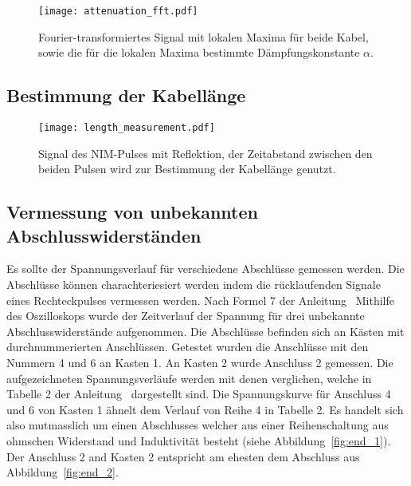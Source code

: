 \begin{figure}
  \centering
  \texttt{[image: attenuation\_fft.pdf]}
  \caption{%
    Fourier-transformiertes Signal mit lokalen Maxima für beide Kabel, sowie die für die lokalen Maxima bestimmte Dämpfungskonstante $α$.
  }\label{fig:attenuation_fft}
\end{figure}

\subsection{Bestimmung der Kabellänge}

\begin{figure}
  \centering
  \texttt{[image: length\_measurement.pdf]}
  \caption{%
    Signal des NIM-Pulses mit Reflektion, der Zeitabstand zwischen den beiden Pulsen wird zur Bestimmung der Kabellänge genutzt.
  }\label{fig:length}
\end{figure}

\begin{table}
  \centering
  \caption{%
    Laufzeitunterschied $\increment t$ und
    Kabellänge $l$ für die drei untersuchten Kabel
  }\label{tab:label}
  
\end{table}

\subsection{Vermessung von unbekannten Abschlusswiderständen}
Es sollte der Spannungsverlauf für verschiedene Abschlüsse gemessen werden. Die Abschlüsse können charachteriesiert werden indem die rücklaufenden
Signale eines Rechteckpulses vermessen werden. Nach Formel 7 der Anleitung~\cite{v52}
Mithilfe des Oszilloskops wurde der Zeitverlauf der Spannung für drei unbekannte Abschlusswiderstände aufgenommen.
Die Abschlüsse befinden sich an Kästen mit durchnummerierten Anschlüssen.
Getestet wurden die Anschlüsse mit den Nummern 4 und 6 an Kasten 1. An Kasten 2 wurde Anschluss 2 gemessen.
Die aufgezeichneten Spannungsverläufe werden mit denen verglichen, welche in Tabelle 2 der Anleitung~\cite{v52} dargestellt sind.
Die Spannungskurve für Anschluss 4 und 6 von Kasten 1 ähnelt dem Verlauf von Reihe 4 in Tabelle 2.
Es handelt sich also mutmasslich um einen Abschlusses welcher aus einer Reihenschaltung aus ohmschen Widerstand und Induktivität besteht (siehe
Abbildung~\ref{fig:end_1}).
Der Anschluss 2 and Kasten 2 entspricht am ehesten dem Abschluss aus Abbildung~\ref{fig:end_2}.

